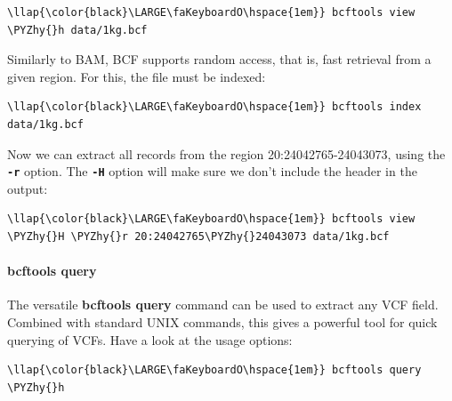 \documentclass[11pt]{article}
\def\PYZhy{\char`\-}
\begin{document}
\begin{terminalinput}
\begin{Verbatim}[commandchars=\\\{\}]
\llap{\color{black}\LARGE\faKeyboardO\hspace{1em}} bcftools view \PYZhy{}h data/1kg.bcf
\end{Verbatim}
\end{terminalinput}

    Similarly to BAM, BCF supports random access, that is, fast retrieval
from a given region. For this, the file must be indexed:

\begin{terminalinput}
\begin{Verbatim}[commandchars=\\\{\}]
\llap{\color{black}\LARGE\faKeyboardO\hspace{1em}} bcftools index data/1kg.bcf
\end{Verbatim}
\end{terminalinput}

    Now we can extract all records from the region 20:24042765-24043073,
using the \textbf{\texttt{-r}} option. The \textbf{\texttt{-H}} option
will make sure we don't include the header in the output:

\begin{terminalinput}
\begin{Verbatim}[commandchars=\\\{\}]
\llap{\color{black}\LARGE\faKeyboardO\hspace{1em}} bcftools view \PYZhy{}H \PYZhy{}r 20:24042765\PYZhy{}24043073 data/1kg.bcf
\end{Verbatim}
\end{terminalinput}

    \hypertarget{bcftools-query}{%
\paragraph{bcftools query}\label{bcftools-query}}

The versatile \textbf{bcftools query} command can be used to extract any
VCF field. Combined with standard UNIX commands, this gives a powerful
tool for quick querying of VCFs. Have a look at the usage options:

\begin{terminalinput}
\begin{Verbatim}[commandchars=\\\{\}]
\llap{\color{black}\LARGE\faKeyboardO\hspace{1em}} bcftools query \PYZhy{}h
\end{Verbatim}
\end{terminalinput}
\end{document}
